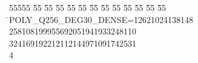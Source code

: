 %
%
\begin{tabbing}
55555 \= 55 \= 55 \= 55 \= 55 \= 55 \= 55 \= 55 \= 55 \= 55 \= 55 \= 55 \= 55 \= \>POLY\_Q256\_DEG30\_DENSE=12621024138148\\[0pt]
258108199955692051941933248110\\[0pt]
324169192212112144971091742531\\[0pt]
4\>\end{tabbing}
